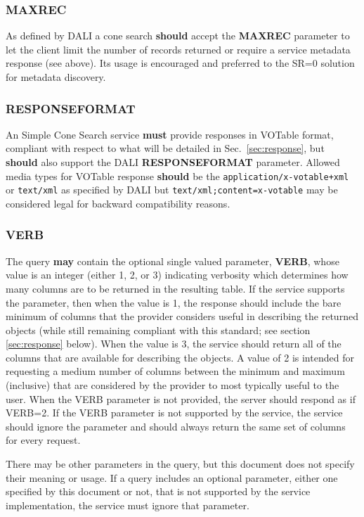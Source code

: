\documentclass[11pt,a4paper]{ivoa} 
\begin{document}
\subsubsection{MAXREC} As defined by DALI a cone search \textbf{should}
accept the \textbf{MAXREC} parameter to let the client limit the number
of records returned or require a service metadata response (see above).
Its usage is encouraged and preferred to the SR=0 solution for metadata
discovery.

\subsubsection{RESPONSEFORMAT} \label{subsubsec:responseformat} An
Simple Cone Search service \textbf{must} provide responses in VOTable
\citep{std:VOTABLE} format, compliant with respect to what will be
detailed in Sec.~\ref{sec:response}, but \textbf{should} also support
the DALI \textbf{RESPONSEFORMAT} parameter. Allowed media types for
VOTable response \textbf{should} be the
\texttt{application/x-votable+xml} or \texttt{text/xml} as specified by
DALI but \texttt{text/xml;content=x-votable} may be considered legal for
backward compatibility reasons.

\subsubsection{VERB} The query \textbf{may} contain the optional single
valued parameter, \textbf{VERB}, whose value is an integer (either 1, 2,
or 3) indicating verbosity which determines how many columns are to be
returned in the resulting table. If the service supports the parameter,
then when the value is 1, the response should include the bare minimum
of columns that the provider considers useful in describing the returned
objects (while still remaining compliant with this standard; see section
\ref{sec:response} below). When the value is 3, the service should
return all of the columns that are available for describing the objects.
A value of 2 is intended for requesting a medium number of columns
between the minimum and maximum (inclusive) that are considered by the
provider to most typically useful to the user. When the VERB parameter
is not provided, the server should respond as if VERB=2. If the VERB
parameter is not supported by the service, the service should ignore the
parameter and should always return the same set of columns for every
request.

There may be other parameters in the query, but this document does not
specify their meaning or usage. If a query includes an optional
parameter, either one specified by this document or not, that is not
supported by the service implementation, the service must ignore that
parameter.
\end{document}
